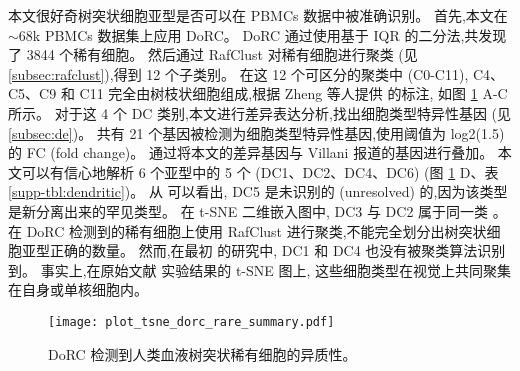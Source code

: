 本文很好奇树突状细胞亚型是否可以在 PBMCs 数据中被准确识别。
首先,本文在 ${\sim}68$k PBMCs 数据集上应用 DoRC。
DoRC 通过使用基于 IQR 的二分法,共发现了 3844 个稀有细胞。
然后通过 RafClust 对稀有细胞进行聚类 (见 \ref{subsec:rafclust}),得到 12 个子类别。
在这 12 个可区分的聚类中 (C0-C11),
C4、C5、C9 和 C11 完全由树枝状细胞组成,根据 Zheng 等人提供 的标注,
如图 \ref{fig:dorc_dendritic} A-C 所示。
对于这 4 个 DC 类别,本文进行差异表达分析,找出细胞类型特异性基因 (见 \ref{subsec:de})。
共有 21 个基因被检测为细胞类型特异性基因,使用阈值为 log2(1.5) 的 FC (fold change)。
通过将本文的差异基因与 Villani  报道的基因进行叠加。
本文可以有信心地解析 6 个亚型中的 5 个 (DC1、DC2、DC4、DC6) (图 \ref{fig:dorc_dendritic} D、表 \ref{supp-tbl:dendritic})。
从  可以看出, DC5 是未识别的 (unresolved) 的,因为该类型是新分离出来的罕见类型。
在 t-SNE 二维嵌入图中, DC3 与 DC2 属于同一类 。
在 DoRC 检测到的稀有细胞上使用 RafClust 进行聚类,不能完全划分出树突状细胞亚型正确的数量。
然而,在最初 的研究中, DC1 和 DC4 也没有被聚类算法识别到。
事实上,在原始文献  实验结果的 t-SNE 图上,
这些细胞类型在视觉上共同聚集在自身或单核细胞内。
\begin{figure}[!htbp]
    \centering
    \texttt{[image: plot\_tsne\_dorc\_rare\_summary.pdf]}
    \caption{
    DoRC 检测到人类血液树突状稀有细胞的异质性。
    }
    \label{fig:dorc_dendritic}
\end{figure}

